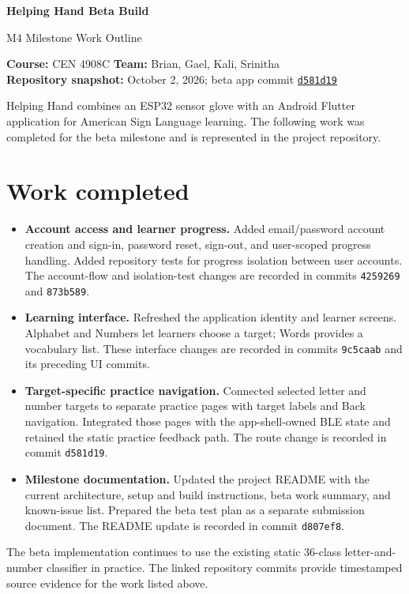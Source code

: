 \documentclass[10pt,letterpaper]{article}
\begin{document}
{\LARGE\bfseries\color{navy}Helping Hand Beta Build\par}
{\large\color{muted}M4 Milestone Work Outline\par}
\vspace{5pt}
\textbf{Course:} CEN 4908C \hfill
\textbf{Team:} Brian, Gael, Kali, Srinitha\\
\textbf{Repository snapshot:} October 2, 2026; beta app commit \href{https://github.com/GG1627/helping-hand/commit/d581d19}{\texttt{d581d19}}

Helping Hand combines an ESP32 sensor glove with an Android Flutter application for American Sign Language learning. The following work was completed for the beta milestone and is represented in the project repository.

\section{Work completed}

\begin{itemize}
  \item \textbf{Account access and learner progress.} Added email/password account creation and sign-in, password reset, sign-out, and user-scoped progress handling. Added repository tests for progress isolation between user accounts. The account-flow and isolation-test changes are recorded in commits \texttt{4259269} and \texttt{873b589}.

  \item \textbf{Learning interface.} Refreshed the application identity and learner screens. Alphabet and Numbers let learners choose a target; Words provides a vocabulary list. These interface changes are recorded in commits \texttt{9c5caab} and its preceding UI commits.

  \item \textbf{Target-specific practice navigation.} Connected selected letter and number targets to separate practice pages with target labels and Back navigation. Integrated those pages with the app-shell-owned BLE state and retained the static practice feedback path. The route change is recorded in commit \texttt{d581d19}.

  \item \textbf{Milestone documentation.} Updated the project README with the current architecture, setup and build instructions, beta work summary, and known-issue list. Prepared the beta test plan as a separate submission document. The README update is recorded in commit \texttt{d807ef8}.
\end{itemize}

The beta implementation continues to use the existing static 36-class letter-and-number classifier in practice. The linked repository commits provide timestamped source evidence for the work listed above.
\end{document}
